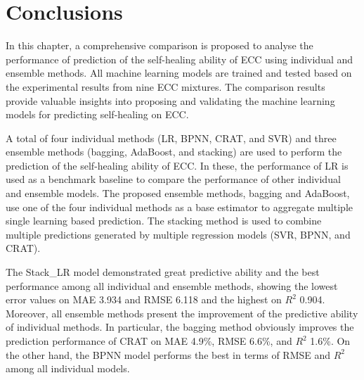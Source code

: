 \documentclass[11pt]{article}
\begin{document}
	
	
	\section{Conclusions}
	\label{con}
	
	In this chapter, a comprehensive comparison is proposed to analyse the performance of prediction of the self-healing ability of ECC using individual and ensemble methods. All machine learning models are trained and tested based on the experimental results from nine ECC mixtures. The comparison results provide valuable insights into proposing and validating the machine learning models for predicting self-healing on ECC.
	
	A total of four individual methods (LR, BPNN, CRAT, and SVR) and three ensemble methods (bagging, AdaBoost, and stacking) are used to perform the prediction of the self-healing ability of ECC. In these, the performance of LR is used as a benchmark baseline to compare the performance of other individual and ensemble models.  The proposed ensemble methods, bagging and AdaBoost, use one of the four individual methods as a base estimator to aggregate multiple single learning based prediction. The stacking method is used to combine multiple predictions generated by multiple regression models (SVR, BPNN, and CRAT).  
	
	The Stack\_LR model demonstrated great predictive ability and the best performance among all individual and ensemble methods, showing the lowest error values on MAE 3.934 and RMSE 6.118 and the highest on $R^2$ 0.904. Moreover, all ensemble methods present the improvement of the predictive ability of individual methods. In particular, the bagging method obviously improves the prediction performance of CRAT on MAE 4.9\%, RMSE 6.6\%, and $R^2$ 1.6\%. On the other hand, the BPNN model performs the best in terms of RMSE and $R^2$ among all individual models.
	
\end{document}
